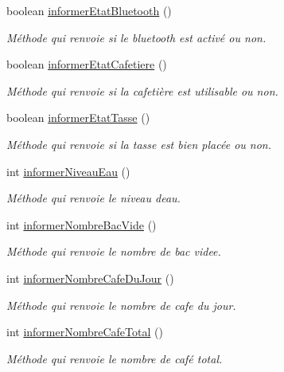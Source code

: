 \begin{DoxyCompactItemize}
boolean \hyperlink{classcom_1_1example_1_1ekawa_1_1_cafetiere_aeff88ad385713a7897074dcdb76077a5}{informer\+Etat\+Bluetooth} ()
\begin{DoxyCompactList}\small\item\em Méthode qui renvoie si le bluetooth est activé ou non. \end{DoxyCompactList}\item 
boolean \hyperlink{classcom_1_1example_1_1ekawa_1_1_cafetiere_a4253a092cf9c84f7b97021e628d5bfb4}{informer\+Etat\+Cafetiere} ()
\begin{DoxyCompactList}\small\item\em Méthode qui renvoie si la cafetière est utilisable ou non. \end{DoxyCompactList}\item 
boolean \hyperlink{classcom_1_1example_1_1ekawa_1_1_cafetiere_ae3c04cc0258cbe554eee5894655c379e}{informer\+Etat\+Tasse} ()
\begin{DoxyCompactList}\small\item\em Méthode qui renvoie si la tasse est bien placée ou non. \end{DoxyCompactList}\item 
int \hyperlink{classcom_1_1example_1_1ekawa_1_1_cafetiere_ab8113e922056276f8097744991ca76b6}{informer\+Niveau\+Eau} ()
\begin{DoxyCompactList}\small\item\em Méthode qui renvoie le niveau d\textquotesingle{}eau. \end{DoxyCompactList}\item 
int \hyperlink{classcom_1_1example_1_1ekawa_1_1_cafetiere_a6c708e64b24c32926eb787c3e7b8645a}{informer\+Nombre\+Bac\+Vide} ()
\begin{DoxyCompactList}\small\item\em Méthode qui renvoie le nombre de bac videe. \end{DoxyCompactList}\item 
int \hyperlink{classcom_1_1example_1_1ekawa_1_1_cafetiere_ac93a294ca5d2dcd4cc9c54bf5c41c3e4}{informer\+Nombre\+Cafe\+Du\+Jour} ()
\begin{DoxyCompactList}\small\item\em Méthode qui renvoie le nombre de cafe du jour. \end{DoxyCompactList}\item 
int \hyperlink{classcom_1_1example_1_1ekawa_1_1_cafetiere_a01de1ada0bfd9d75e9c873ca1bdb62df}{informer\+Nombre\+Cafe\+Total} ()
\begin{DoxyCompactList}\small\item\em Méthode qui renvoie le nombre de café total. \end{DoxyCompactList}\item 

\end{DoxyCompactItemize}
